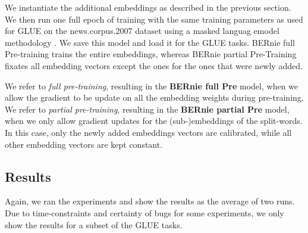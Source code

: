 \documentclass[a4paper,12pt,twoside,openright]{report}
\begin{document}

We instantiate the additional embeddings as described in the previous section.
We then run one full epoch of training with the same training parameters as used for GLUE on the news.corpus.2007 dataset using a masked languag emodel methodology .
We save this model and load it for the GLUE tasks.
BERnie full Pre-training trains the entire embeddings, whereas BERnie partial Pre-Training fixates all embedding vectors except the ones for the ones that were newly added.

We refer to \textit{full pre-training}, resulting in the \textbf{BERnie full Pre} model, when we allow the gradient to be update on all the embedding weights during pre-training.
We refer to \textit{partial pre-training}, resulting in the \textbf{BERnie partial Pre} model, when we only allow gradient updates for the (sub-)embeddings of the split-words.
In this case, only the newly added embeddings vectors are calibrated, while all other embedding vectors are kept constant.


\subsection{Results}

Again, we ran the experiments and show the results as the average of two runs.
Due to time-constraints and certainty of bugs for some experiments, we only show the results for a subset of the GLUE tasks.


\end{document}
